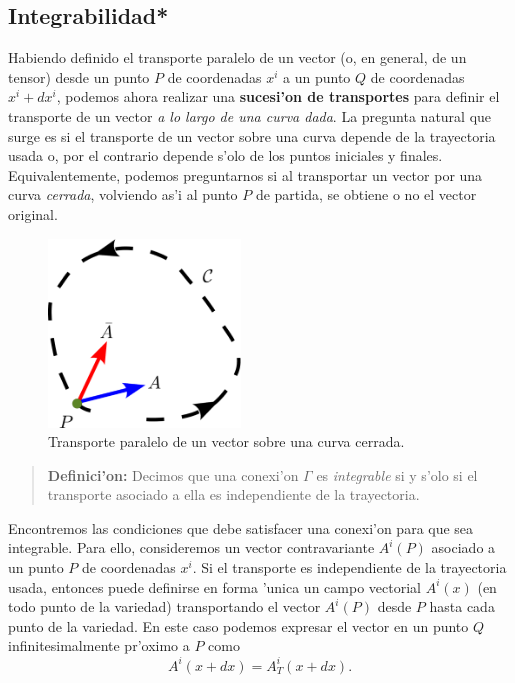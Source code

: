 \subsection{Integrabilidad*}\label{sec:integ}
Habiendo definido el transporte paralelo de un vector (o, en
general, de un tensor) desde un punto $P$
de coordenadas $x^i $ a un punto $Q$ de coordenadas $x^i +dx^i$, podemos
ahora realizar una \textbf{sucesi'on de transportes} para definir el transporte de un vector \textit{a lo largo de una curva dada}. La pregunta natural que surge es si el transporte de un vector sobre una curva depende de la trayectoria usada o, por el contrario depende s'olo de los puntos iniciales y finales. Equivalentemente, podemos preguntarnos si al transportar un vector por una curva \textit{cerrada}, volviendo as'i al punto $P$ de partida, se obtiene o no el vector original.
\begin{center}
\begin{figure}[H]
\centerline{\includegraphics[height=5cm]{fig/fig-transporte-curva-cerrada.pdf}}
\caption{Transporte paralelo de un vector sobre una curva cerrada.}
\label{dibujo}
\end{figure}
\end{center}
\begin{quotation}
\textbf{Definici'on:} Decimos que una conexi'on $\Gamma$ es \textit{integrable} si y s'olo si el transporte asociado a ella es independiente de la trayectoria.
\end{quotation}
Encontremos las condiciones que debe satisfacer una conexi'on para que sea
integrable.
Para ello, consideremos un vector contravariante $A^i(P)$ asociado a un punto
$P$ de coordenadas $x^i$. Si el transporte es independiente de la trayectoria
usada, entonces puede definirse en forma 'unica un campo vectorial $A^i(x)$ (en todo punto de la variedad) transportando el vector $A^i(P)$ desde $P$ hasta cada punto de la variedad. En este caso podemos expresar el vector en un punto $Q$ infinitesimalmente
pr'oximo a $P$ como
\begin{equation}
A^i(x+dx)=A^i_T(x+dx) . \label{condint}
\end{equation}
